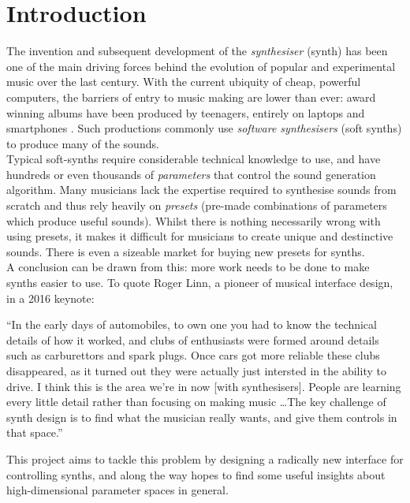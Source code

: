 \documentclass[11pt, oneside]{report}   	%
\begin{document}
\chapter{Introduction}
The invention and subsequent development of the \emph{synthesiser} (synth) has been one of the main driving forces behind the evolution of popular and experimental music over the last century. With the current ubiquity of cheap, powerful computers, the barriers of entry to music making are lower than ever: award winning albums have been produced by teenagers, entirely on laptops and smartphones \cite{IphoneProducer}. Such productions commonly use \emph{software synthesisers} (soft synths) to produce many of the sounds.\\
Typical soft-synths require considerable technical knowledge to use, and have hundreds or even thousands of \emph{parameters} that control the sound generation algorithm. Many musicians lack the expertise required to synthesise sounds from scratch and thus rely heavily on \emph{presets} (pre-made combinations of parameters which produce useful sounds). Whilst there is nothing necessarily wrong with using presets, it makes it difficult for musicians to create unique and destinctive sounds. There is even a sizeable market for buying new presets for synths.\\
A conclusion can be drawn from this: more work needs to be done to make synths easier to use. To quote Roger Linn, a pioneer of musical interface design, in a 2016 keynote: \cite{LinnKeynote}
\begin{displayquote}
	\singlespacing
	``In the early days of automobiles, to own one you had to know the technical details of how it worked, and clubs of enthusiasts were formed around details such as carburettors and spark plugs. Once cars got more reliable these clubs disappeared, as it turned out they were actually just intersted in the ability to drive. I think this is the area we're in now [with synthesisers]. People are learning every little detail rather than focusing on making music \dots The key challenge of synth design is to find what the musician really wants, and give them controls in that space.''
\end{displayquote}
This project aims to tackle this problem by designing a radically new interface for controlling synths, and along the way hopes to find some useful insights about high-dimensional parameter spaces in general.
%
\end{document}
